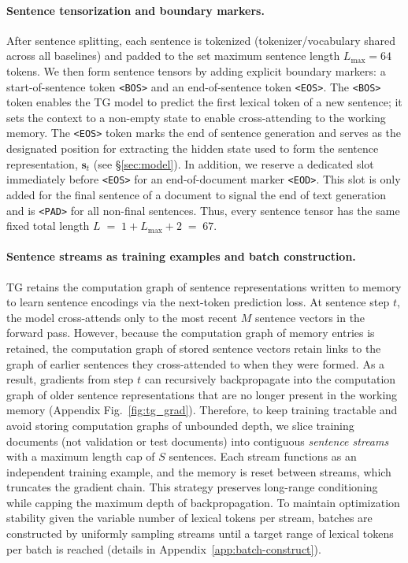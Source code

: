 \documentclass{article}
\begin{document}
\paragraph{Sentence tensorization and boundary markers.}
After sentence splitting, each sentence is tokenized (tokenizer/vocabulary shared across all baselines) and padded to the set maximum sentence length $L_{\max} = 64$ tokens. We then form sentence tensors by adding explicit boundary markers:
a start-of-sentence token \texttt{<BOS>} and an end-of-sentence token \texttt{<EOS>}. The \texttt{<BOS>} token enables the TG model to predict the first lexical token of a new sentence; it sets the context to a non-empty state to enable cross-attending to the working memory. The \texttt{<EOS>} token marks the end of sentence generation and serves as the designated position for extracting the hidden state used to form the sentence representation, $\mathbf{s}_t$ (see \S\ref{sec:model}).
In addition, we reserve a dedicated slot immediately before \texttt{<EOS>} for an end-of-document marker \texttt{<EOD>}. This slot is only added for the final sentence of a document to signal the end of text generation and is \texttt{<PAD>} for all non-final sentences.
Thus, every sentence tensor has the same fixed total length $
L \;=\; 1 + L_{\max} + 2 \;=\; 67.$


\paragraph{Sentence streams as training examples and batch construction.}
TG retains the computation graph of sentence representations written to memory to learn sentence encodings via the next-token prediction loss. At sentence step $t$, the model cross-attends only to the most recent $M$ sentence vectors in the forward pass. However, because the computation graph of memory entries is retained, the computation graph of stored sentence vectors retain links to the graph of earlier sentences they cross-attended to when they were formed. As a result, gradients from step $t$ can recursively backpropagate into the computation graph of older sentence representations that are no longer present in the working memory (Appendix Fig.~\ref{fig:tg_grad}). Therefore, to keep training tractable and avoid storing computation graphs of unbounded depth, we slice training documents (not validation or test documents) into contiguous \emph{sentence streams} with a maximum length cap of $S$ sentences. Each stream functions as an independent training example, and the memory is reset between streams, which truncates the gradient chain. This strategy preserves long-range conditioning while capping the maximum depth of backpropagation. To maintain optimization stability given the variable number of lexical tokens per stream, batches are constructed by uniformly sampling streams until a target range of lexical tokens per batch is reached (details in Appendix~\ref{app:batch-construct}).
\end{document}
